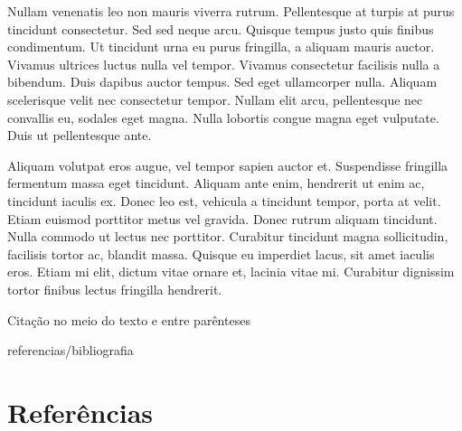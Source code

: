 \documentclass[book,A4paper,10pt,twoside,oldfontcommands]{memoir}\usepackage[]{graphicx}\usepackage[usenames,dvipsnames]{color}
\begin{document}
\begin{btUnit}
Nullam venenatis leo non mauris viverra rutrum. Pellentesque at turpis
at purus tincidunt consectetur. Sed sed neque arcu. Quisque tempus
justo quis finibus condimentum. Ut tincidunt urna eu purus fringilla,
a aliquam mauris auctor. Vivamus ultrices luctus nulla vel tempor.
Vivamus consectetur facilisis nulla a bibendum. Duis dapibus auctor
tempus. Sed eget ullamcorper nulla. Aliquam scelerisque velit nec
consectetur tempor. Nullam elit arcu, pellentesque nec convallis eu,
sodales eget magna. Nulla lobortis congue magna eget vulputate. Duis
ut pellentesque ante.

Aliquam volutpat eros augue, vel tempor sapien auctor et. Suspendisse
fringilla fermentum massa eget tincidunt. Aliquam ante enim, hendrerit
ut enim ac, tincidunt iaculis ex. Donec leo est, vehicula a tincidunt
tempor, porta at velit. Etiam euismod porttitor metus vel gravida.
Donec rutrum aliquam tincidunt. Nulla commodo ut lectus nec porttitor.
Curabitur tincidunt magna sollicitudin, facilisis tortor ac, blandit
massa. Quisque eu imperdiet lacus, sit amet iaculis eros. Etiam mi
elit, dictum vitae ornare et, lacinia vitae mi. Curabitur dignissim
tortor finibus lectus fringilla hendrerit.

Citação no meio do texto \citet{Casella-Berger2011} e entre parênteses
\citep{Gelman2007}

\begin{btSect}{referencias/bibliografia}
\section*{Referências}
\btPrintCited
\end{btSect}

\end{btUnit}
\end{document}
